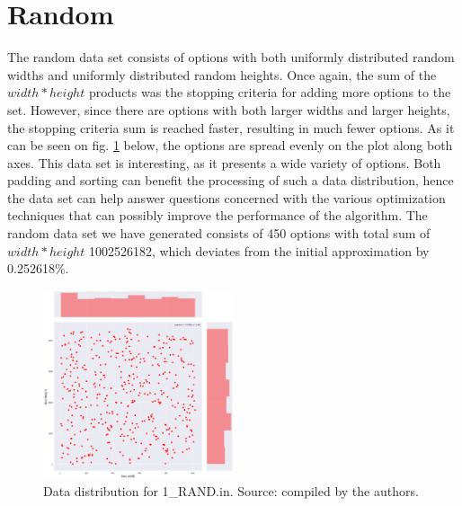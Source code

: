 \section{Random}
The random data set consists of options with both uniformly distributed random widths and uniformly distributed random heights. Once again, the sum of the $width*height$ products was the stopping criteria for adding more options to the set. However, since there are options with both larger widths and larger heights, the stopping criteria sum is reached faster, resulting in much fewer options. As it can be seen on fig. \ref{fig:data:random} below, the options are spread evenly on the plot along both axes. This data set is interesting, as it presents a wide variety of options. Both padding and sorting can benefit the processing of such a data distribution, hence the data set can help answer questions concerned with the various optimization techniques that can possibly improve the performance of the algorithm. The random data set we have generated consists of 450 options with total sum of $width*height$ 1002526182, which deviates from the initial approximation by 0.252618\%. 

\begin{figure}[H]
	\centering
	\includegraphics[width=0.5\textwidth]{img/1_RAND_plot.png}
	\caption{Data distribution for 1\_RAND.in. Source: compiled by the authors.}
	\label{fig:data:random}
\end{figure}

